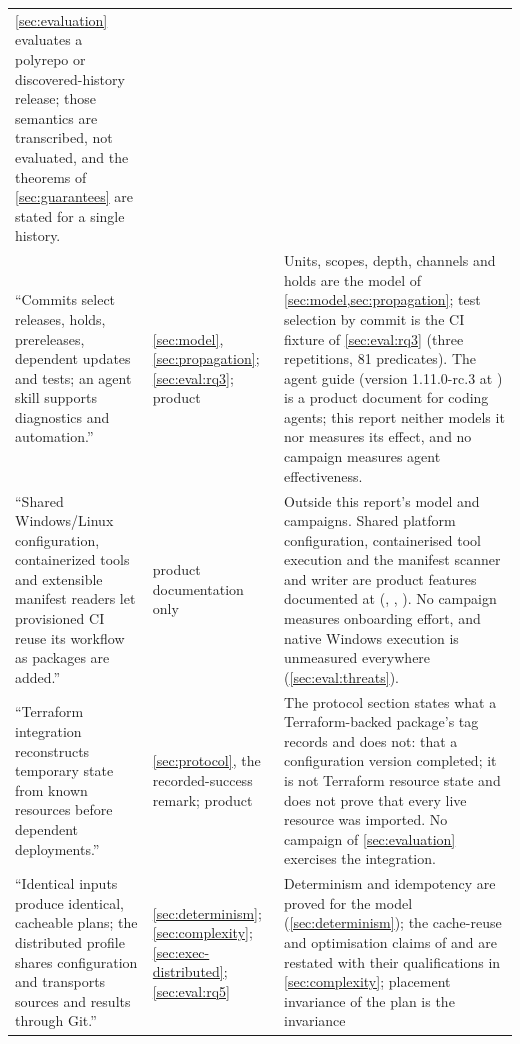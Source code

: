\begin{center}
\begin{longtable}{@{}L{4.3cm}L{2.5cm}L{7.3cm}@{}}
\cref{sec:evaluation} evaluates a polyrepo or discovered-history release; those
semantics are transcribed, not evaluated, and the theorems of
\cref{sec:guarantees} are stated for a single history. \\
``Commits select releases, holds, prereleases, dependent updates and tests; an
agent skill supports diagnostics and automation.'' & \cref{sec:model},
\cref{sec:propagation}; \cref{sec:eval:rq3}; product
 & Units, scopes, depth, channels and holds
are the model of \cref{sec:model,sec:propagation}; test selection by commit is
the CI fixture of \cref{sec:eval:rq3} (three repetitions, 81 predicates). The
agent guide (version 1.11.0-rc.3 at ) is a product document for
coding agents; this report neither models it nor measures its effect, and no
campaign measures agent effectiveness. \\
``Shared Windows/Linux configuration, containerized tools and extensible
manifest readers let provisioned CI reuse its workflow as packages are
added.'' & product documentation only & Outside this report's model and
campaigns. Shared platform configuration, containerised tool execution and the
manifest scanner and writer are product features documented at
 (,
, ). No
campaign measures onboarding effort, and native Windows execution is
unmeasured everywhere (\cref{sec:eval:threats}). \\
``Terraform integration reconstructs temporary state from known resources
before dependent deployments.'' & \cref{sec:protocol}, the recorded-success
remark; product  & The
protocol section states what a Terraform-backed package's tag records and does
not: that a configuration version completed; it is not Terraform resource
state and does not prove that every live resource was imported. No campaign
of \cref{sec:evaluation} exercises the integration. \\
``Identical inputs produce identical, cacheable plans; the distributed profile
shares configuration and transports sources and results through Git.'' &
\cref{sec:determinism}; \cref{sec:complexity}; \cref{sec:exec-distributed};
\cref{sec:eval:rq5} & Determinism and idempotency are proved for the model
(\cref{sec:determinism}); the cache-reuse and optimisation claims of
 and  are restated with their qualifications in
\cref{sec:complexity}; placement invariance of the plan is the invariance

\end{longtable}
\end{center}
